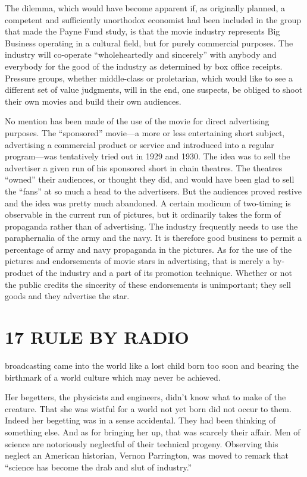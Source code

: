 \documentclass[twoside,nohyper,openany,nobib]{tufte-book}
\let\oldchapter\chapter
\def\chapter{%
  \setcounter{footnote}{0}%
  \oldchapter
}
\begin{document}
The dilemma, which would have become apparent if, as originally planned,
a competent and sufficiently unorthodox economist had been included in
the group that made the Payne Fund study, is that the movie industry
represents Big Business operating in a cultural field, but for purely
commercial purposes. The industry will co-operate ``wholeheartedly and
sincerely'' with anybody and everybody for the good of the industry as
determined by box office receipts. Pressure groups, whether middle-class
or proletarian, which would like to see a different set of value
judgments, will in the end, one suspects, be obliged to shoot their own
movies and build their own audiences.

No mention has been made of the use of the movie for direct advertising
purposes. The ``sponsored'' movie---a more or less entertaining short
subject, advertising a commercial product or service and introduced into
a regular program---was tentatively tried out in 1929 and 1930. The idea
was to sell the advertiser a given run of his sponsored short in chain
theatres. The theatres ``owned'' their audiences, or thought they did,
and would have been glad to sell the ``fans'' at so much a head to the
advertisers. But the audiences proved restive and the idea was pretty
much abandoned. A certain modicum of two-timing is observable in the
current run of pictures, but it ordinarily takes the form of propaganda
rather than of advertising. The industry frequently needs to use the
paraphernalia of the army and the navy. It is therefore good business to
permit a percentage of army and navy propaganda in the pictures. As for
the use of the pictures and endorsements of movie stars in advertising,
that is merely a by-product of the industry and a part of its promotion
technique. Whether or not the public credits the sincerity of these
endorsements is unimportant; they sell goods and they advertise the
star.



\chapter[17 \hspace*{1mm} RULE BY RADIO]{17 RULE BY RADIO}


 broadcasting came into the world like a lost child born too soon
and bearing the birthmark of a world culture which may never be
achieved.

Her begetters, the physicists and engineers, didn't know what to make of
the creature. That she was wistful for a world not yet born did not
occur to them. Indeed her begetting was in a sense accidental. They had
been thinking of something else. And as for bringing her up, that was
scarcely their affair. Men of science are notoriously neglectful of
their technical progeny. Observing this neglect an American historian,
Vernon Parrington, was moved to remark that ``science has become the
drab and slut of industry.''
\end{document}
